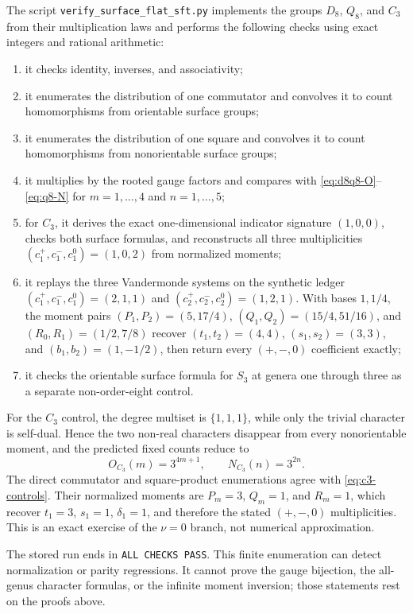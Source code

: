 The script \texttt{verify\_surface\_flat\_sft.py} implements the groups
$D_8$, $Q_8$, and $C_3$ from their multiplication laws and performs the following
checks using exact integers and rational arithmetic:
\begin{enumerate}
 \item it checks identity, inverses, and associativity;
 \item it enumerates the distribution of one commutator and convolves it to
 count homomorphisms from orientable surface groups;
 \item it enumerates the distribution of one square and convolves it to count
 homomorphisms from nonorientable surface groups;
 \item it multiplies by the rooted gauge factors and compares with
 \eqref{eq:d8q8-O}--\eqref{eq:q8-N} for $m=1,\ldots,4$ and
 $n=1,\ldots,5$;
 \item for $C_3$, it derives the exact one-dimensional indicator signature
 $(1,0,0)$, checks both surface formulas, and reconstructs all three
 multiplicities $(c_1^+,c_1^-,c_1^0)=(1,0,2)$ from normalized moments;
 \item it replays the three Vandermonde systems on the synthetic ledger
 $(c_1^+,c_1^-,c_1^0)=(2,1,1)$ and
 $(c_2^+,c_2^-,c_2^0)=(1,2,1)$.  With bases $1,1/4$, the moment pairs
 $(P_1,P_2)=(5,17/4)$, $(Q_1,Q_2)=(15/4,51/16)$, and
 $(R_0,R_1)=(1/2,7/8)$ recover $(t_1,t_2)=(4,4)$,
 $(s_1,s_2)=(3,3)$, and $(b_1,b_2)=(1,-1/2)$, then return every
 $(+,-,0)$ coefficient exactly;
 \item it checks the orientable surface formula for $S_3$ at genera one
 through three as a separate non-order-eight control.
\end{enumerate}
For the $C_3$ control, the degree multiset is $\{1,1,1\}$, while only the
trivial character is self-dual.  Hence the two non-real characters disappear
from every nonorientable moment, and the predicted fixed counts reduce to
\begin{equation}
 O_{C_3}(m)=3^{4m+1},\qquad N_{C_3}(n)=3^{2n}.
 \label{eq:c3-controls}
\end{equation}
The direct commutator and square-product enumerations agree with
\eqref{eq:c3-controls}.  Their normalized moments are $P_m=3$, $Q_m=1$, and
$R_m=1$, which recover $t_1=3$, $s_1=1$, $\delta_1=1$, and therefore the
stated $(+,-,0)$ multiplicities.  This is an exact exercise of the
$\nu=0$ branch, not numerical approximation.

The stored run ends in \texttt{ALL CHECKS PASS}.  This finite enumeration can
detect normalization or parity regressions.  It cannot prove the gauge
bijection, the all-genus character formulas, or the infinite moment inversion;
those statements rest on the proofs above.

